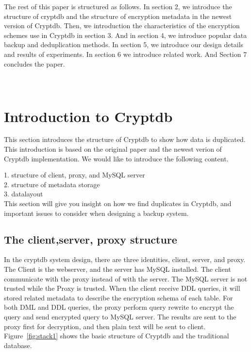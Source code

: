 The rest of this paper is structured as follows. In section 2, we introduce the structure of cryptdb and the structure of encryption metadata in the newest version of Cryptdb. Then, we introduction the characteristics of the encryption schemes use in Cryptdb in section 3. And in section 4, we introduce popular data backup and deduplication methods. In section 5, we introduce our design details and results of experiments. In section 6 we introduce related work. And Section 7 concludes the paper.
\\ \\ \\ 





\section{Introduction to Cryptdb}

This section introduces the structure of Cryptdb to show how data is duplicated. This introduction is based on the original paper and the newest verion of Cryptdb implementation. We would like to introduce the following content.

1. structure of client, proxy, and MySQL server\\
2. structure of metadata storage\\
3. datalayout \\

This section will give you insight on how we find duplicates in Cryptdb, and important issues to consider when designing a backup system.

\subsection{The client,server, proxy structure}

In the cryptdb system design, there are three identities, client, server, and proxy. The Client is the webserver, and the server has MySQL installed. The client communicate with the proxy instead of with the server. The MySQL server is not trusted while the Proxy is trusted. When the client receive DDL queries, it will stored related metadata to describe the encryption schema of each table. For both DML and DDL queries, the proxy perform query rewrite to encrypt the query and send encrypted query to MySQL server. The results are sent to the proxy first for decryption, and then plain text will be sent to client. Figure~\ref{fig:stack1} shows the basic structure of Cryptdb and the traditional database. 


